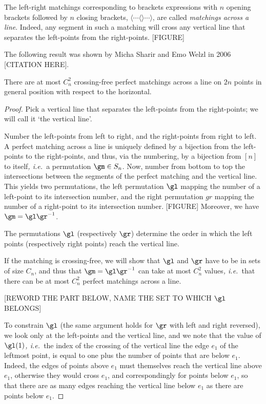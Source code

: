 \documentclass[10pt, a4paper, twoside]{basestyle}
\newcommand{\idest}{\emph{, i.e.\ }}
\begin{document}
The left-right matchings corresponding to brackets expressions with $n$ opening brackets followed
by $n$ closing brackets, $\langle \dotsb \langle \rangle \dotsb \rangle$, are called \emph{matchings
across a line}. Indeed, any segment in such a matching will cross any vertical line that separates
the left-points from the right-points. [FIGURE]

The following result was shown by Micha Sharir and Emo Welzl in 2006 [CITATION HERE].
\begin{theorem}
There are at most $C_n^2$ crossing-free perfect matchings across a line on $2n$ points in general position with
respect to the horizontal.
\begin{proof}
Pick a vertical line that separates the left-points from the right-points; we will call it `the vertical line'.

Number the left-points from left to right, and the right-points from right to left.
A perfect matching across a line is uniquely defined by a bijection from the left-points to the right-points,
and thus, via the numbering, by a bijection from $[n]$ to itself\idest a permutation $\gm \in S_n$.
Now, number from bottom to top the intersections between the segments of the perfect matching and the vertical
line.
This yields two permutations, the left permutation $\gl$ mapping the number of a left-point to its intersection number,
and the right permutation $gr$ mapping the number of a right-point to its intersection number. [FIGURE]
Moreover, we have $\gm = \gl \gr^{-1}$.

The permutations $\gl$ (respectively $\gr$) determine the order in which the left points (respectively right points)
reach the vertical line.

If the matching is crossing-free, we will show that $\gl$ and $\gr$ have to be in sets of size $C_n$, and thus
that $\gm = \gl \gr^{-1}$ can take at most $C_n^2$ values\idest that there can be at most $C_n^2$ perfect matchings
across a line.

[REWORD THE PART BELOW, NAME THE SET TO WHICH $\gl$ BELONGS]

To constrain $\gl$ (the same argument holds for $\gr$ with left and right reversed), we look only at the left-points
and the vertical line, and we note that the value of
$\gl(1)$\idest the index of the crossing of the vertical line the edge $e_1$ of the leftmost point,
is equal to one plus the number of points that are below $e_1$. Indeed, the edges of points above $e_1$ must
themselves reach the vertical line above $e_1$, otherwise they would cross $e_1$, and correspondingly for
points below $e_1$, so that there are as many edges reaching the vertical line below $e_1$ as there are points
below $e_1$.


\end{proof}
\end{theorem}
\end{document}
